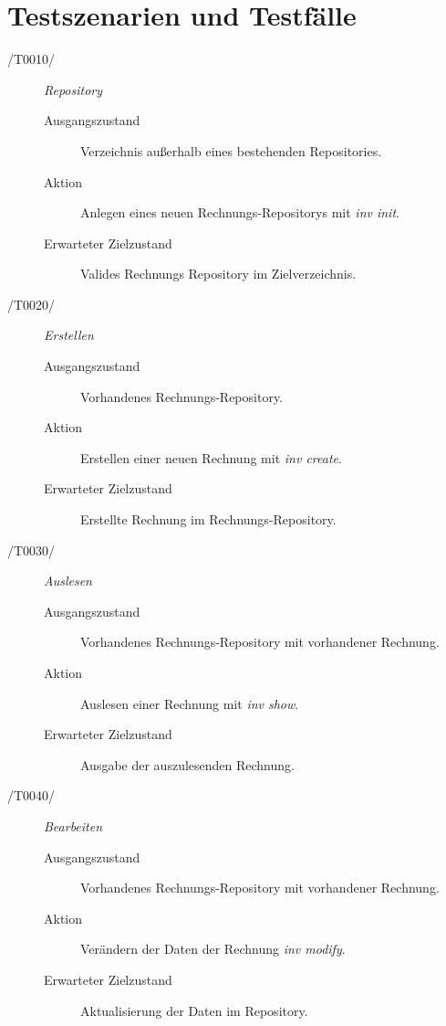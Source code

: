 
\section{Testszenarien und Testfälle}



\begin{description}
  \item[/T0010/]
	\textit{Repository}
	\begin{description}
		\item[Ausgangszustand]
		Verzeichnis außerhalb eines bestehenden Repositories.
		\item[Aktion]
		Anlegen eines neuen Rechnungs-Repositorys mit \textit{inv init}.
		\item[Erwarteter Zielzustand]
		Valides Rechnungs Repository im Zielverzeichnis.
	\end{description}

  \item[/T0020/]
	\textit{Erstellen}
	\begin{description}
		\item[Ausgangszustand]
		Vorhandenes Rechnungs-Repository.
		\item[Aktion]
		Erstellen einer neuen Rechnung mit \textit{inv create}.
		\item[Erwarteter Zielzustand]
		Erstellte Rechnung im Rechnungs-Repository.
	\end{description}

  \item[/T0030/]
	\textit{Auslesen}
	\begin{description}
		\item[Ausgangszustand]
		Vorhandenes Rechnungs-Repository mit vorhandener Rechnung.
		\item[Aktion]
		Auslesen einer Rechnung mit \textit{inv show}.
		\item[Erwarteter Zielzustand]
		Ausgabe der auszulesenden Rechnung.
	\end{description}

  \item[/T0040/]
	\textit{Bearbeiten}
	\begin{description}
		\item[Ausgangszustand]
		Vorhandenes Rechnungs-Repository mit vorhandener Rechnung.
		\item[Aktion]
		Verändern der Daten der Rechnung \textit{inv modify}.
		\item[Erwarteter Zielzustand]
		Aktualisierung der Daten im Repository.
	\end{description}


\end{description}
